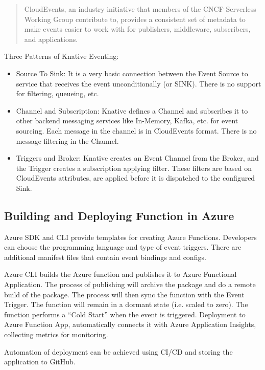 \documentclass[12pt]{article}
\begin{document}
\begin{flushleft}
\begin{quote}
    CloudEvents, an industry initiative that members of the CNCF Serverless Working Group contribute to, provides a consistent set of metadata to make events easier to work with for publishers, middleware, subscribers, and applications. \\ 
    \cite{cncf_to_host_cloudevents_in_the_sandbox_2023} 
\end{quote}


Three Patterns of Knative Eventing:
\begin{itemize}
    \item Source To Sink: It is a very basic connection between the Event Source to service that receives the event unconditionally (or SINK). There is no support for filtering, queueing, etc.

    \item	Channel and Subscription: Knative defines a Channel and subscribes it to other backend messaging services like In-Memory, Kafka, etc. for event sourcing. Each message in the channel is in CloudEvents format. There is no message filtering in the Channel.

    \item Triggers and Broker: Knative creates an Event Channel from the Broker, and the Trigger creates a subscription applying filter. These filters are based on CloudEvents attributes, are applied before it is dispatched to the configured Sink.
\end{itemize}

\subsection{Building and Deploying Function in Azure}
Azure SDK and CLI provide templates for creating Azure Functions. Developers can choose the programming language and type of event triggers. There are additional manifest files that contain event bindings and configs. 

Azure CLI builds the Azure function and publishes it to Azure Functional Application. The process of publishing will archive the package and do a remote build of the package. The process will then sync the function with the Event Trigger. The function will remain in a dormant state (i.e. scaled to zero). The function performs a “Cold Start” when the event is triggered. Deployment to Azure Function App, automatically connects it with Azure Application Insights, collecting metrics for monitoring.

Automation of deployment can be achieved using CI/CD and storing the application to GitHub. 


\end{flushleft}
\end{document}
